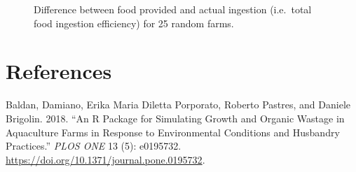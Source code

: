\documentclass[
  a4paper,
]{article}
\newlength{\cslhangindent}
\newenvironment{CSLReferences}[2] %
 {\begin{list}{}{%
  \setlength{\itemindent}{0pt}
  \setlength{\leftmargin}{0pt}
  \setlength{\parsep}{0pt}
  \ifodd #1
   \setlength{\leftmargin}{\cslhangindent}
   \setlength{\itemindent}{-1\cslhangindent}
  \fi
  \setlength{\itemsep}{#2\baselineskip}}}
 {\end{list}}
\begin{document}
\begin{figure}


\caption{\label{fig-uneaten-feed}Difference between food provided and
actual ingestion (i.e.~total food ingestion efficiency) for 25 random
farms.}

\end{figure}%

\section*{References}\label{references}

\label{refs}
\begin{CSLReferences}{1}{0}
Baldan, Damiano, Erika Maria Diletta Porporato, Roberto Pastres, and
Daniele Brigolin. 2018. {``An {R} Package for Simulating Growth and
Organic Wastage in Aquaculture Farms in Response to Environmental
Conditions and Husbandry Practices.''} \emph{PLOS ONE} 13 (5): e0195732.
\url{https://doi.org/10.1371/journal.pone.0195732}.

\end{CSLReferences}
\end{document}

